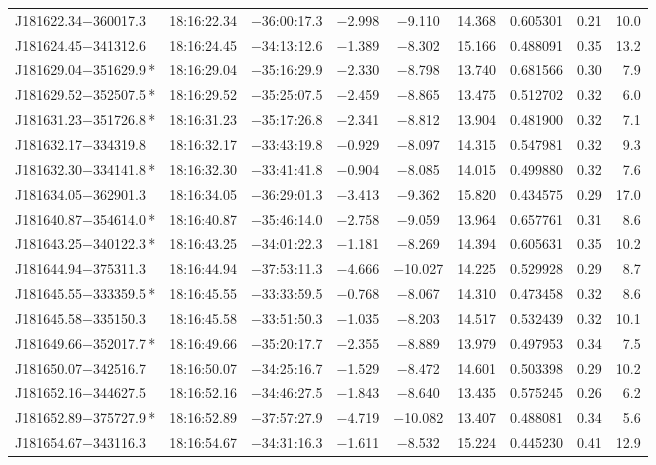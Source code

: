 \begin{table*}
\begin{tabular}{lcccccccr}
J181622.34$-$360017.3 & 18:16:22.34 & $-$36:00:17.3 & $-$2.998 & $-$9.110 & 14.368 & 0.605301 & 0.21 & 10.0 \\
J181624.45$-$341312.6 & 18:16:24.45 & $-$34:13:12.6 & $-$1.389 & $-$8.302 & 15.166 & 0.488091 & 0.35 & 13.2 \\
J181629.04$-$351629.9\,* & 18:16:29.04 & $-$35:16:29.9 & $-$2.330 & $-$8.798 & 13.740 & 0.681566 & 0.30 & 7.9 \\
J181629.52$-$352507.5\,* & 18:16:29.52 & $-$35:25:07.5 & $-$2.459 & $-$8.865 & 13.475 & 0.512702 & 0.32 & 6.0 \\
J181631.23$-$351726.8\,* & 18:16:31.23 & $-$35:17:26.8 & $-$2.341 & $-$8.812 & 13.904 & 0.481900 & 0.32 & 7.1 \\
J181632.17$-$334319.8 & 18:16:32.17 & $-$33:43:19.8 & $-$0.929 & $-$8.097 & 14.315 & 0.547981 & 0.32 & 9.3 \\
J181632.30$-$334141.8\,* & 18:16:32.30 & $-$33:41:41.8 & $-$0.904 & $-$8.085 & 14.015 & 0.499880 & 0.32 & 7.6 \\
J181634.05$-$362901.3 & 18:16:34.05 & $-$36:29:01.3 & $-$3.413 & $-$9.362 & 15.820 & 0.434575 & 0.29 & 17.0 \\
J181640.87$-$354614.0\,* & 18:16:40.87 & $-$35:46:14.0 & $-$2.758 & $-$9.059 & 13.964 & 0.657761 & 0.31 & 8.6 \\
J181643.25$-$340122.3\,* & 18:16:43.25 & $-$34:01:22.3 & $-$1.181 & $-$8.269 & 14.394 & 0.605631 & 0.35 & 10.2 \\
J181644.94$-$375311.3 & 18:16:44.94 & $-$37:53:11.3 & $-$4.666 & $-$10.027 & 14.225 & 0.529928 & 0.29 & 8.7 \\
J181645.55$-$333359.5\,* & 18:16:45.55 & $-$33:33:59.5 & $-$0.768 & $-$8.067 & 14.310 & 0.473458 & 0.32 & 8.6 \\
J181645.58$-$335150.3 & 18:16:45.58 & $-$33:51:50.3 & $-$1.035 & $-$8.203 & 14.517 & 0.532439 & 0.32 & 10.1 \\
J181649.66$-$352017.7\,* & 18:16:49.66 & $-$35:20:17.7 & $-$2.355 & $-$8.889 & 13.979 & 0.497953 & 0.34 & 7.5 \\
J181650.07$-$342516.7 & 18:16:50.07 & $-$34:25:16.7 & $-$1.529 & $-$8.472 & 14.601 & 0.503398 & 0.29 & 10.2 \\
J181652.16$-$344627.5 & 18:16:52.16 & $-$34:46:27.5 & $-$1.843 & $-$8.640 & 13.435 & 0.575245 & 0.26 & 6.2 \\
J181652.89$-$375727.9\,* & 18:16:52.89 & $-$37:57:27.9 & $-$4.719 & $-$10.082 & 13.407 & 0.488081 & 0.34 & 5.6 \\
J181654.67$-$343116.3 & 18:16:54.67 & $-$34:31:16.3 & $-$1.611 & $-$8.532 & 15.224 & 0.445230 & 0.41 & 12.9 \\

\end{tabular}
\end{table*}
